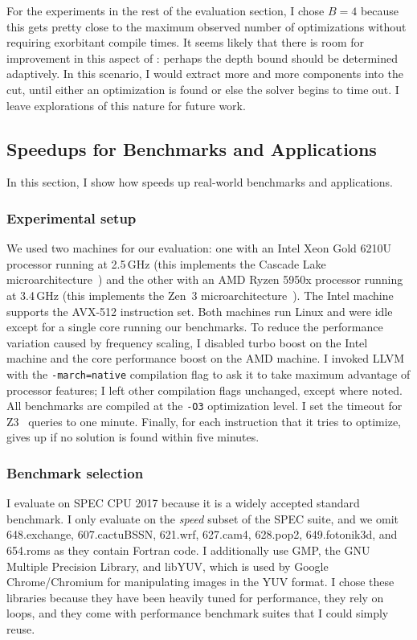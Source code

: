 For the experiments in the rest of the evaluation section, I chose
$B=4$ because this gets pretty close to the maximum observed number of
optimizations without requiring exorbitant compile times.
%
It seems likely that there is room for improvement in this aspect of
\minotaur: perhaps the depth bound should be determined adaptively.
%
In this scenario, I would extract more and more components into the
cut, until either an optimization is found or else the solver begins
to time out.
%
I leave explorations of this nature for future work.


\subsection{Speedups for Benchmarks and Applications}

In this section, I show how \minotaur{} speeds up real-world benchmarks
and applications.

\subsubsection{Experimental setup}
%
We used two machines for our evaluation: one with an Intel Xeon Gold
6210U processor running at 2.5\,GHz (this implements the Cascade Lake
microarchitecture~\cite{cascadelake}) and the other with an
AMD Ryzen 5950x processor
running at 3.4\,GHz (this implements the Zen~3 microarchitecture~\cite{zen3}).
The Intel machine supports the AVX-512 instruction set.
%
Both machines run Linux and were idle except for a single core running
our benchmarks.
%
To reduce the performance variation caused by frequency scaling, I
disabled turbo boost on the Intel machine and the core performance
boost on the AMD machine.
%
I invoked LLVM with the \texttt{-march=native} compilation flag to
ask it to take maximum advantage of processor features; I left other
compilation flags unchanged, except where noted.
%
All benchmarks are compiled at the \texttt{-O3} optimization level.
%
I set the timeout for Z3~\cite{z3} queries to one minute.
%
Finally, for each instruction that it tries to optimize, \minotaur{} gives
up if no solution is found within five minutes.


\subsubsection{Benchmark selection}
%
I evaluate on SPEC CPU 2017%
because it is a widely accepted standard
benchmark.
%
I only evaluate on the \emph{speed} subset of the SPEC suite, and we omit
648.exchange, 607.cactuBSSN, 621.wrf, 627.cam4, 628.pop2, 649.fotonik3d,
and 654.roms as they contain Fortran code.
%
I additionally use GMP, the GNU Multiple Precision Library, and libYUV,
which is used by Google Chrome/Chromium for manipulating images in the
YUV format.
%
I chose these libraries because they have been heavily tuned for
performance, they rely on loops, and they come with performance
benchmark suites that I could simply reuse.


